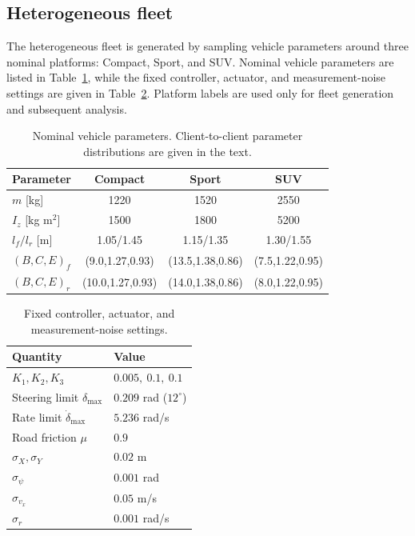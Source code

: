 \subsection{Heterogeneous fleet}
%
The heterogeneous fleet is generated by sampling vehicle parameters around three nominal platforms: 
Compact, Sport, and SUV. 
Nominal vehicle parameters are listed in Table~\ref{tab:vehicle_parameters}, while the fixed controller, actuator, and measurement-noise settings are given in Table~\ref{tab:fixed_settings}. 
Platform labels are used only for fleet generation and subsequent analysis.

\begin{table}[t]
\centering
\caption{Nominal vehicle parameters. Client-to-client parameter distributions are given in the text.}
\label{tab:vehicle_parameters}
\scriptsize
\setlength{\tabcolsep}{2.3pt}
\begin{tabular}{@{}lccc@{}}
\toprule
Parameter & Compact & Sport & SUV\\
\midrule
$m$ [kg] & 1220 & 1520 & 2550\\
$I_z$ [kg m$^2$] & 1500 & 1800 & 5200\\
$l_f/l_r$ [m] & 1.05/1.45 & 1.15/1.35 & 1.30/1.55\\
$(B,C,E)_f$ & (9.0,1.27,0.93) & (13.5,1.38,0.86) & (7.5,1.22,0.95)\\
$(B,C,E)_r$ & (10.0,1.27,0.93) & (14.0,1.38,0.86) & (8.0,1.22,0.95)\\
\bottomrule
\end{tabular}
\end{table}

\begin{table}[t]
\centering
\caption{Fixed controller, actuator, and measurement-noise settings.}
\label{tab:fixed_settings}
\scriptsize
\setlength{\tabcolsep}{4pt}
\begin{tabular}{@{}ll@{}}
\toprule
Quantity & Value\\
\midrule
$K_1,K_2,K_3$ & $0.005,\ 0.1,\ 0.1$\\
Steering limit $\delta_{\max}$ & $0.209$ rad ($12^\circ$)\\
Rate limit $\dot\delta_{\max}$ & $5.236$ rad/s\\
Road friction $\mu$ & $0.9$\\
$\sigma_X,\sigma_Y$ & $0.02$ m\\
$\sigma_\psi$ & $0.001$ rad\\
$\sigma_{v_x}$ & $0.05$ m/s\\
$\sigma_r$ & $0.001$ rad/s\\
\bottomrule
\end{tabular}
\end{table}

